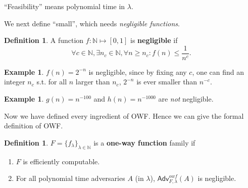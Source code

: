 \documentclass[12pt]{article}
\newcommand{\N}{\mathbb{N}}
\newcommand{\Adv}{\textsf{Adv}}
\theoremstyle{definition}
\newtheorem{definition}[theorem]{Definition}
\newtheorem{example}[theorem]{Example}
\begin{document}
``Feasibility'' means polynomial time in $\lambda$.

We next define ``small'', which needs \emph{negligible functions}.
\begin{definition}
A function $f : \N \mapsto [0,1]$ is {\bf negligible} if
$$\forall c\in\N, \exists n_c\in\N, \forall n\geq n_c : f(n) \leq \frac{1}{n^c}.$$
\end{definition}

\begin{example}
$f(n) = 2^{-n}$ is negligible, since by fixing any $c$, one can find an integer $n_c$ s.t. for all $n$ larger than $n_c$, $2^{-n}$ is ever smaller than $n^{-c}$.
\end{example}

\begin{example}
$g(n) = n^{-100}$ and $h(n) = n^{-1000}$ are \emph{not} negligible.
\end{example}

Now we have defined every ingredient of OWF. Hence we can give the formal definition of OWF.
\begin{definition}
$F=\{f_\lambda\}_{\lambda\in\N}$ is a {\bf one-way function} family if
\begin{enumerate}
\item $F$ is efficiently computable.
\item For all polynomial time adversaries $A$ (in $\lambda$), $\Adv_{F,\lambda}^{owf}(A)$ is negligible.
\end{enumerate}
\end{definition}
\end{document}
